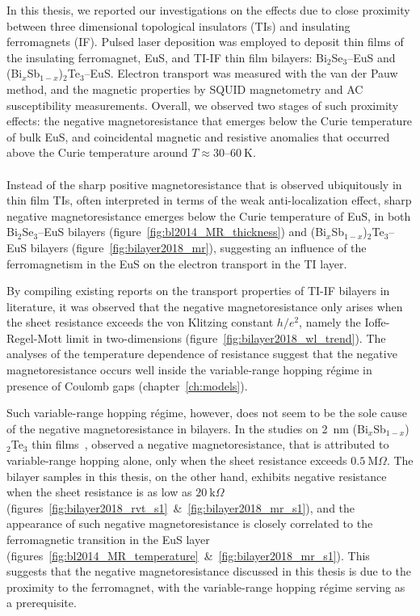 In this thesis, we reported our investigations on the effects due to close proximity between three dimensional topological insulators (TIs) and insulating ferromagnets (IF). Pulsed laser deposition was employed to deposit thin films of the insulating ferromagnet, EuS, and TI-IF thin film bilayers: Bi$_2$Se$_3$--EuS and (Bi$_x$Sb$_{1-x}$)$_2$Te$_3$--EuS. Electron transport was measured with the van der Pauw method, and the magnetic properties by SQUID magnetometry and AC susceptibility measurements. Overall, we observed two stages of such proximity effects: the negative magnetoresistance that emerges below the Curie temperature of bulk EuS, and coincidental magnetic and resistive anomalies that occurred above the Curie temperature around $T\approx30$--$60~\mathrm{K}$.

\paragraph{}
Instead of the sharp positive magnetoresistance that is observed ubiquitously in thin film TIs, often interpreted in terms of the weak anti-localization effect, sharp negative magnetoresistance emerges below the Curie temperature of EuS, in both Bi$_2$Se$_3$--EuS bilayers (figure~\ref{fig:bl2014_MR_thickness}) and (Bi$_x$Sb$_{1-x}$)$_2$Te$_3$--EuS bilayers (figure~\ref{fig:bilayer2018_mr}), suggesting an influence of the ferromagnetism in the EuS on the electron transport in the TI layer.

By compiling existing reports on the transport properties of TI-IF bilayers in literature, it was observed that the negative magnetoresistance only arises when the sheet resistance exceeds the von Klitzing constant $h / e^2$, namely the Ioffe-Regel-Mott limit in two-dimensions (figure~\ref{fig:bilayer2018_wl_trend}). The analyses of the temperature dependence of resistance suggest that the negative magnetoresistance occurs well inside the variable-range hopping r\'egime in presence of Coulomb gaps (chapter~\ref{ch:models}).

Such variable-range hopping r\'egime, however, does not seem to be the sole cause of the negative magnetoresistance in bilayers. In the studies on \SI{2}{nm} (Bi$_x$Sb$_{1-x}$)$_2$Te$_3$ thin films~\cite{liao2015}, \citeauthor{liao2015} observed a negative magnetoresistance, that is attributed to variable-range hopping alone, only when the sheet resistance exceeds $0.5~\textrm{M}\Omega$. The bilayer samples in this thesis, on the other hand, exhibits negative resistance when the sheet resistance is as low as $20~\textrm{k}\Omega$ (figures~\ref{fig:bilayer2018_rvt_s1}~\&~\ref{fig:bilayer2018_mr_s1}), and the appearance of such negative magnetoresistance is closely correlated to the ferromagnetic transition in the EuS layer (figures~\ref{fig:bl2014_MR_temperature}~\&~\ref{fig:bilayer2018_mr_s1}). This suggests that the negative magnetoresistance discussed in this thesis is due to the proximity to the ferromagnet, with the variable-range hopping r\'egime serving as a prerequisite.

